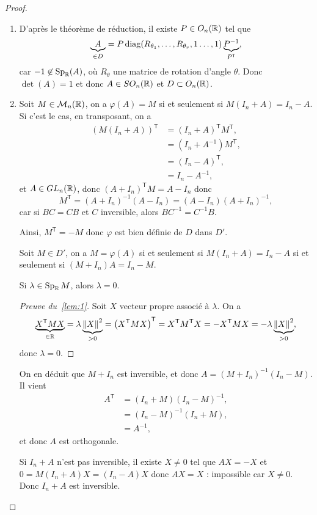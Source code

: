 \documentclass[12pt]{article}
\begin{document}
\begin{proof}
	\phantom{}
	\begin{enumerate}
		\item D'après le théorème de réduction, il existe $P\in O_n(\mathbb{R})$ tel que 
		\begin{equation}
			\underbrace{A}_{\in D}=P\operatorname{diag}(R_{\theta_1},\dots,R_{\theta_r},1\dots,1)\underbrace{P^{-1}}_{P^{\mathsf{T}}},
		\end{equation}
		car $-1\not\in\operatorname{Sp}_{\mathbb{R}}(A)$, où $R_{\theta}$ une matrice de rotation d'angle $\theta$. Donc $\det(A)=1$ et donc $A\in SO_n(\mathbb{R})$ et $D\subset O_n(\mathbb{R})$.

		\item Soit $M\in\mathcal{M}_n(\mathbb{R})$, on a $\varphi(A)=M$ si et seulement si $M(I_n+A)=I_n-A$. Si c'est le cas, en transposant, on a
		\begin{align}
			\left(M(I_n+A)\right)^{\mathsf{T}}
			&=\left(I_n+A\right)^{\mathsf{T}}M^{\mathsf{T}},\\
			&=\left(I_n+A^{-1}\right)M^{\mathsf{T}},\\
			&=\left(I_n-A\right)^{\mathsf{T}},\\
			&=I_n-A^{-1},
		\end{align}
		et $A\in GL_n(\mathbb{R})$, donc $\left(A+I_n\right)^{\mathsf{T}}M=A-I_n$ donc 
		\begin{equation}
			M^{\mathsf{T}}=(A+I_n)^{-1}(A-I_n)=(A-I_n)(A+I_n)^{-1},
		\end{equation}
		car si $BC=CB$ et $C$ inversible, alors $BC^{-1}=C^{-1}B$.

		Ainsi, $M^{\mathsf{T}}=-M$ donc $\varphi$ est bien définie de $D$ dans $D'$.

		Soit $M\in D'$, on a $M=\varphi(A)$ si et seulement si $M(I_n+A)=I_n-A$ si et seulement si $(M+I_n)A=I_n-M$.
		\begin{lemma}
			\label{lem:1}
			Si $\lambda\in\operatorname{Sp}_{\mathbb{R}}M$, alors $\lambda=0$.
		\end{lemma}
		\begin{proof}[Preuve du~\ref{lem:1}]
			Soit $X$ vecteur propre associé à $\lambda$. On a 
			\begin{equation}
				\underbrace{X^{\mathsf{T}}MX}_{\in\mathbb{R}}=\lambda\underbrace{\left\lVert X\right\rVert^{2}}_{>0}=\left(X^{\mathsf{T}}MX\right)^{\mathsf{T}}=X^{\mathsf{T}}M^{\mathsf{T}}X=-X^{\mathsf{T}}MX=-\lambda\underbrace{\left\lVert X\right\rVert^{2}}_{>0},
			\end{equation}
			donc $\lambda=0$.
		\end{proof}

		On en déduit que $M+I_n$ est inversible, et donc $A=(M+I_n)^{-1}(I_n-M)$. Il vient 
		\begin{align}
			A^{\mathsf{T}}
			&=(I_n+M)(I_n-M)^{-1},\\
			&=(I_n-M)^{-1}(I_n+M),\\
			&=A^{-1},
		\end{align}
		et donc $A$ est orthogonale.

		Si $I_n+A$ n'est pas inversible, il existe $X\neq0$ tel que $AX=-X$ et $0=M(I_n+A)X=(I_n-A)X$ donc $AX=X$ : impossible car $X\neq0$. Donc $I_n+A$ est inversible.
	\end{enumerate}
\end{proof}
\end{document}
